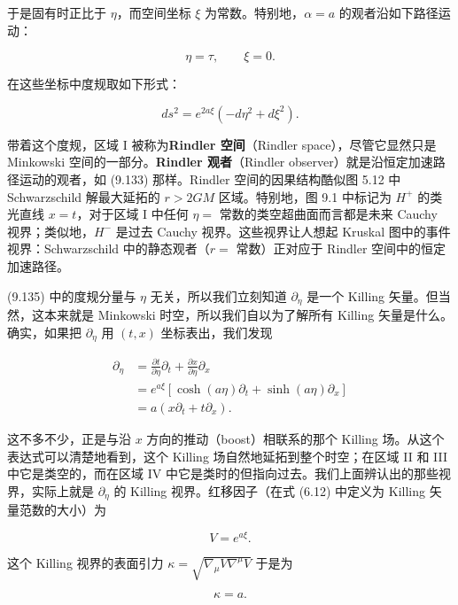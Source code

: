 于是固有时正比于 $\eta$，而空间坐标 $\xi$ 为常数。特别地，$\alpha=a$ 的观者沿如下路径运动：

\begin{equation*}
\eta = \tau, \qquad \xi = 0.
\tag{9.134}
\end{equation*}

在这些坐标中度规取如下形式：

\begin{equation*}
ds^2 = e^{2a\xi}(-d\eta^2 + d\xi^2).
\tag{9.135}
\end{equation*}

带着这个度规，区域 I 被称为\textbf{Rindler 空间}（Rindler space），尽管它显然只是 Minkowski 空间的一部分。\textbf{Rindler 观者}（Rindler observer）就是沿恒定加速路径运动的观者，如 (9.133) 那样。Rindler 空间的因果结构酷似图 5.12 中 Schwarzschild 解最大延拓的 $r>2GM$ 区域。特别地，图 9.1 中标记为 $H^{+}$ 的类光直线 $x=t$，对于区域 I 中任何 $\eta=$ 常数的类空超曲面而言都是未来 Cauchy 视界；类似地，$H^{-}$ 是过去 Cauchy 视界。这些视界让人想起 Kruskal 图中的事件视界：Schwarzschild 中的静态观者（$r=$ 常数）正对应于 Rindler 空间中的恒定加速路径。

(9.135) 中的度规分量与 $\eta$ 无关，所以我们立刻知道 $\partial_{\eta}$ 是一个 Killing 矢量。但当然，这本来就是 Minkowski 时空，所以我们自以为了解所有 Killing 矢量是什么。确实，如果把 $\partial_{\eta}$ 用 $(t,x)$ 坐标表出，我们发现

\begin{align*}
\partial_{\eta} &= \frac{\partial t}{\partial\eta}\partial_t + \frac{\partial x}{\partial\eta}\partial_x \\
&= e^{a\xi}\left[\cosh(a\eta)\partial_t + \sinh(a\eta)\partial_x\right] \\
&= a(x\partial_t + t\partial_x).
\tag{9.136}
\end{align*}

这不多不少，正是与沿 $x$ 方向的推动（boost）相联系的那个 Killing 场。从这个表达式可以清楚地看到，这个 Killing 场自然地延拓到整个时空；在区域 II 和 III 中它是类空的，而在区域 IV 中它是类时的但指向过去。我们上面辨认出的那些视界，实际上就是 $\partial_{\eta}$ 的 Killing 视界。红移因子（在式 (6.12) 中定义为 Killing 矢量范数的大小）为

\begin{equation*}
V = e^{a\xi}.
\tag{9.137}
\end{equation*}

这个 Killing 视界的表面引力 $\kappa=\sqrt{\nabla_{\mu}V\nabla^{\mu}V}$ 于是为

\begin{equation*}
\kappa = a.
\tag{9.138}
\end{equation*}

